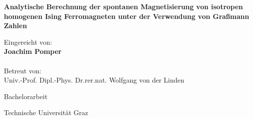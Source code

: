 \documentclass[fontsize = 12pt]{scrartcl}
\numberwithin{equation}{section}
\begin{document}



\begin{titlepage}
    \begin{center}
        \vspace*{1cm}
            
        \LARGE
        \textbf{Analytische Berechnung der spontanen Magnetisierung von isotropen homogenen Ising Ferromagneten unter der Verwendung von Graßmann Zahlen}
            
        \vspace{1.5cm}    
        
        \large   
        Eingereicht von:\\
        \vspace{0.3cm}
        \textbf{Joachim Pomper} \\
        \vspace{1.5cm}
        \\
        
        \vspace{1.5cm}
        Betreut von:\\
        \vspace{0.3cm}
        Univ.-Prof. Dipl.-Phys. Dr.rer.nat. Wolfgang von der Linden\\
        
        \vfill
            
        Bachelorarbeit
            
        \vspace{0.8cm}
            
            
        \Large
        Technische Universität Graz\\
            
    \end{center}
\end{titlepage}
\end{document}
